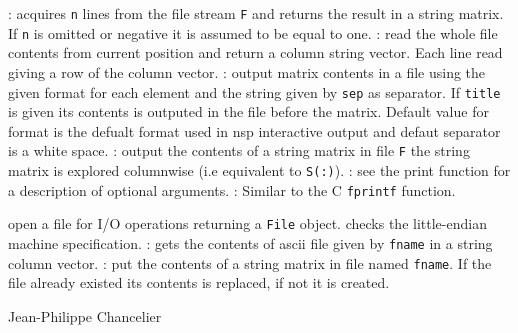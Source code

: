 \begin{itemize}
  : acquires \verb+n+ lines from the file stream \verb+F+ and returns 
  the result in a string matrix. If \verb+n+ is omitted or negative it is assumed to be equal to 
  one. 
  : read the whole file contents from current position
  and return a column string vector. Each line read giving a row of the column vector.
  : 
    output  matrix contents in a file using the given format for each element 
    and the string given by \verb+sep+ as separator. If \verb+title+ is given 
    its contents is outputed in the file before the matrix. Default value 
    for format is the defualt format used in nsp interactive output and defaut 
    separator is a white space.
  : output the contents of a string matrix in file \verb+F+ 
  the string matrix is explored columnwise (i.e equivalent to \verb+S(:)+).
  : 
  see the print function for a description of optional arguments.
  : Similar to the C \verb+fprintf+ function. 
\end{itemize}

\begin{itemize}
   open a file for I/O operations returning a \verb+File+ object.
   checks the little-endian machine specification.
  : gets the contents of ascii file given by \verb+fname+ 
  in a string column vector.
  : put the contents of a string matrix in file named 
  \verb+fname+. If the file already existed its contents is replaced, if not it is 
  created. 
\end{itemize}

\begin{examples}
  \begin{program}
  \end{program}
\end{examples}

\begin{manseealso}
\end{manseealso}

\begin{authors}
  Jean-Philippe Chancelier 
\end{authors}

